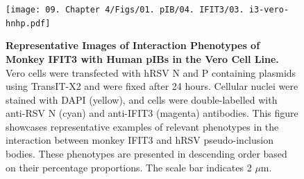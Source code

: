 \begin{figure}
    \centering
    \texttt{[image: 09. Chapter 4/Figs/01. pIB/04. IFIT3/03. i3-vero-hnhp.pdf]}
    \caption[Representative Images of Interaction Phenotypes of Monkey IFIT3 with Human pIBs in the Vero Cell Line.]{\textbf{Representative Images of Interaction Phenotypes of Monkey IFIT3 with Human pIBs in the Vero Cell Line.} Vero cells were transfected with hRSV N and P containing plasmids using TransIT-X2 and were fixed after 24 hours. Cellular nuclei were stained with DAPI (yellow), and cells were double-labelled with anti-RSV N (cyan) and anti-IFIT3 (magenta) antibodies. This figure showcases representative examples of relevant phenotypes in the interaction between monkey IFIT3 and hRSV pseudo-inclusion bodies. These phenotypes are presented in descending order based on their percentage proportions. The scale bar indicates 2 \(\mu \mbox{m}\).}
    \label{fig:Representative Images of Interaction Phenotypes of Monkey IFIT3 with Human pIBs in the VERO Cell Line}
\end{figure}

